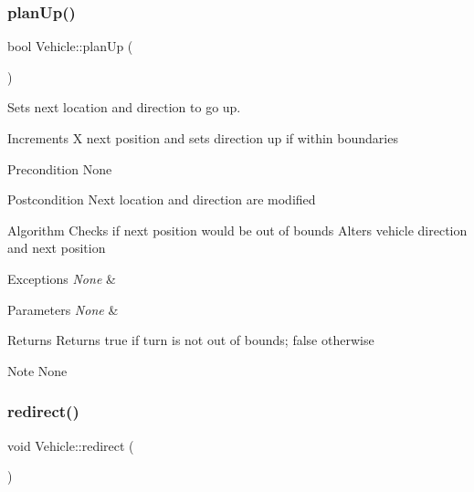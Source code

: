 \subsubsection{\texorpdfstring{plan\+Up()}{planUp()}}
{\footnotesize\ttfamily bool Vehicle\+::plan\+Up (\begin{DoxyParamCaption}{ }\end{DoxyParamCaption})\hspace{0.3cm}{\ttfamily [protected]}}



Sets next location and direction to go up. 

Increments X next position and sets direction up if within boundaries

\begin{DoxyPrecond}{Precondition}
None
\end{DoxyPrecond}
\begin{DoxyPostcond}{Postcondition}
Next location and direction are modified
\end{DoxyPostcond}
\begin{DoxyParagraph}{Algorithm}
Checks if next position would be out of bounds Alters vehicle direction and next position
\end{DoxyParagraph}

\begin{DoxyExceptions}{Exceptions}
{\em None} & \\
\hline
\end{DoxyExceptions}

\begin{DoxyParams}{Parameters}
{\em None} & \\
\hline
\end{DoxyParams}
\begin{DoxyReturn}{Returns}
Returns true if turn is not out of bounds; false otherwise
\end{DoxyReturn}
\begin{DoxyNote}{Note}
None 
\end{DoxyNote}
\hypertarget{class_vehicle_a19fc8fc5b5e9c2f69beea018e7113bfd}{}\label{class_vehicle_a19fc8fc5b5e9c2f69beea018e7113bfd} 
\subsubsection{\texorpdfstring{redirect()}{redirect()}}
{\footnotesize\ttfamily void Vehicle\+::redirect (\begin{DoxyParamCaption}{ }\end{DoxyParamCaption})}



